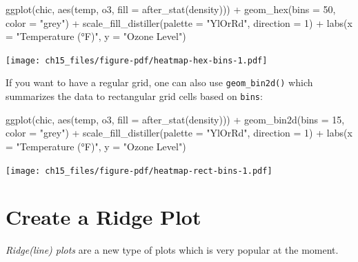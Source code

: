 \documentclass[
  letterpaper,
]{scrbook}
\newenvironment{Shaded}{\begin{snugshade}}{\end{snugshade}}
\newcommand{\AttributeTok}[1]{\textcolor[rgb]{0.40,0.45,0.13}{#1}}
\newcommand{\DecValTok}[1]{\textcolor[rgb]{0.68,0.00,0.00}{#1}}
\newcommand{\FunctionTok}[1]{\textcolor[rgb]{0.28,0.35,0.67}{#1}}
\newcommand{\NormalTok}[1]{\textcolor[rgb]{0.00,0.23,0.31}{#1}}
\newcommand{\SpecialCharTok}[1]{\textcolor[rgb]{0.37,0.37,0.37}{#1}}
\newcommand{\StringTok}[1]{\textcolor[rgb]{0.13,0.47,0.30}{#1}}
\begin{document}
\begin{Shaded}
\begin{Highlighting}[]
\FunctionTok{ggplot}\NormalTok{(chic, }\FunctionTok{aes}\NormalTok{(temp, o3, }\AttributeTok{fill =} \FunctionTok{after\_stat}\NormalTok{(density))) }\SpecialCharTok{+}
  \FunctionTok{geom\_hex}\NormalTok{(}\AttributeTok{bins =} \DecValTok{50}\NormalTok{, }\AttributeTok{color =} \StringTok{"grey"}\NormalTok{) }\SpecialCharTok{+}
  \FunctionTok{scale\_fill\_distiller}\NormalTok{(}\AttributeTok{palette =} \StringTok{"YlOrRd"}\NormalTok{, }\AttributeTok{direction =} \DecValTok{1}\NormalTok{) }\SpecialCharTok{+}
  \FunctionTok{labs}\NormalTok{(}\AttributeTok{x =} \StringTok{"Temperature (°F)"}\NormalTok{, }\AttributeTok{y =} \StringTok{"Ozone Level"}\NormalTok{)}
\end{Highlighting}
\end{Shaded}

\texttt{[image: ch15\_files/figure-pdf/heatmap-hex-bins-1.pdf]}

If you want to have a regular grid, one can also use
\texttt{geom\_bin2d()} which summarizes the data to rectangular grid
cells based on \texttt{bins}:

\begin{Shaded}
\begin{Highlighting}[]
\FunctionTok{ggplot}\NormalTok{(chic, }\FunctionTok{aes}\NormalTok{(temp, o3, }\AttributeTok{fill =} \FunctionTok{after\_stat}\NormalTok{(density))) }\SpecialCharTok{+}
  \FunctionTok{geom\_bin2d}\NormalTok{(}\AttributeTok{bins =} \DecValTok{15}\NormalTok{, }\AttributeTok{color =} \StringTok{"grey"}\NormalTok{) }\SpecialCharTok{+}
  \FunctionTok{scale\_fill\_distiller}\NormalTok{(}\AttributeTok{palette =} \StringTok{"YlOrRd"}\NormalTok{, }\AttributeTok{direction =} \DecValTok{1}\NormalTok{) }\SpecialCharTok{+}
  \FunctionTok{labs}\NormalTok{(}\AttributeTok{x =} \StringTok{"Temperature (°F)"}\NormalTok{, }\AttributeTok{y =} \StringTok{"Ozone Level"}\NormalTok{)}
\end{Highlighting}
\end{Shaded}

\texttt{[image: ch15\_files/figure-pdf/heatmap-rect-bins-1.pdf]}

\section{Create a Ridge Plot}\label{create-a-ridge-plot}

\emph{Ridge(line) plots} are a new type of plots which is very popular
at the moment.
\end{document}
